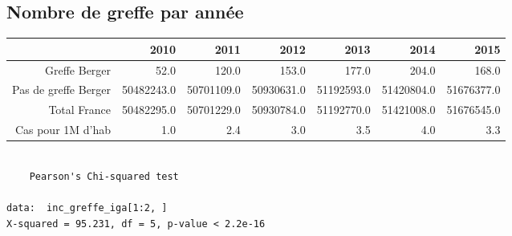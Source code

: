 \documentclass[11pt,a4paper]{article}\usepackage[]{graphicx}\usepackage[]{color}
\makeatletter
\newenvironment{kframe}{%
 \def\at@end@of@kframe{}%
 \ifinner\ifhmode%
  \def\at@end@of@kframe{\end{minipage}}%
  \begin{minipage}{\columnwidth}%
 \fi\fi%
 \def\FrameCommand##1{\hskip\@totalleftmargin \hskip-\fboxsep
 \colorbox{shadecolor}{##1}\hskip-\fboxsep
     \hskip-\linewidth \hskip-\@totalleftmargin \hskip\columnwidth}%
 \MakeFramed {\advance\hsize-\width
   \@totalleftmargin\z@ \linewidth\hsize
   \@setminipage}}%
 {\par\unskip\endMakeFramed%
 \at@end@of@kframe}
\newenvironment{knitrout}{}{} %
\makeatother
\begin{document}
  \subsection{Nombre de greffe par année}

\begin{table}[H]
\centering
\begin{tabular}{rrrrrrr}
  \hline
 & 2010 & 2011 & 2012 & 2013 & 2014 & 2015 \\ 
  \hline
Greffe Berger & 52.0 & 120.0 & 153.0 & 177.0 & 204.0 & 168.0 \\ 
  Pas de greffe Berger & 50482243.0 & 50701109.0 & 50930631.0 & 51192593.0 & 51420804.0 & 51676377.0 \\ 
  Total France & 50482295.0 & 50701229.0 & 50930784.0 & 51192770.0 & 51421008.0 & 51676545.0 \\ 
  Cas pour 1M d'hab & 1.0 & 2.4 & 3.0 & 3.5 & 4.0 & 3.3 \\ 
   \hline
\end{tabular}
\end{table}


\begin{knitrout}
\color{fgcolor}\begin{kframe}
\begin{verbatim}

	Pearson's Chi-squared test

data:  inc_greffe_iga[1:2, ]
X-squared = 95.231, df = 5, p-value < 2.2e-16
\end{verbatim}
\end{kframe}
\end{knitrout}
\end{document}
